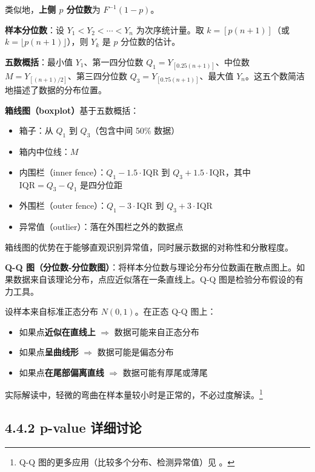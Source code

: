 类似地，\textbf{上侧 $p$ 分位数}为 $F^{-1}(1-p)$。

\textbf{样本分位数}：设 $Y_1 < Y_2 < \cdots < Y_n$ 为次序统计量。取 $k = [p(n+1)]$（或 $k = \lfloor p(n+1) \rfloor$），则 $Y_k$ 是 $p$ 分位数的估计。

\textbf{五数概括}：最小值 $Y_1$、第一四分位数 $Q_1 = Y_{[0.25(n+1)]}$、中位数 $M = Y_{[(n+1)/2]}$、第三四分位数 $Q_3 = Y_{[0.75(n+1)]}$、最大值 $Y_n$。这五个数简洁地描述了数据的分布位置。

\textbf{箱线图（boxplot）}基于五数概括：

\begin{itemize}
\item 箱子：从 $Q_1$ 到 $Q_3$（包含中间 50\% 数据）
\item 箱内中位线：$M$
\item 内围栏（inner fence）：$Q_1 - 1.5\cdot\text{IQR}$ 到 $Q_3 + 1.5\cdot\text{IQR}$，其中 $\text{IQR} = Q_3 - Q_1$ 是四分位距
\item 外围栏（outer fence）：$Q_1 - 3\cdot\text{IQR}$ 到 $Q_3 + 3\cdot\text{IQR}$
\item 异常值（outlier）：落在外围栏之外的数据点
\end{itemize}

箱线图的优势在于能够直观识别异常值，同时展示数据的对称性和分散程度。

\textbf{Q-Q 图（分位数-分位数图）}：将样本分位数与理论分布分位数画在散点图上。如果数据来自该理论分布，点应近似落在一条直线上。Q-Q 图是检验分布假设的有力工具。

\begin{example}[正态 Q-Q 图的解读]\label{ex:normal-qq}
设样本来自标准正态分布 $N(0,1)$。在正态 Q-Q 图上：
\begin{itemize}
\item 如果点\textbf{近似在直线上} $\Rightarrow$ 数据可能来自正态分布
\item 如果点\textbf{呈曲线形} $\Rightarrow$ 数据可能是偏态分布
\item 如果点\textbf{在尾部偏离直线} $\Rightarrow$ 数据可能有厚尾或薄尾
\end{itemize}

实际解读中，轻微的弯曲在样本量较小时是正常的，不必过度解读。\footnote{Q-Q 图的更多应用（比较多个分布、检测异常值）见 \cite{Wilks2006}。}
\end{example}

\subsection{4.4.2 p-value 详细讨论}\label{sec:4.4.2}


